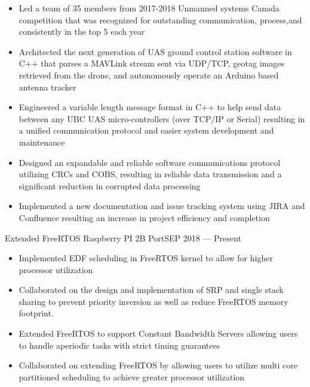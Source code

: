 
\begin{projects}
    {}{
        \begin{itemize}
            \item Led a team of 35 members from 2017-2018 Unmanned systems Canada competition that
                  was recognized for outstanding communication, process,and consistently in the top
                  5 each year
            \item Architected the next generation of UAS ground control station software in C++ that
                  parses a MAVLink stream sent via UDP/TCP, geotag images retrieved from the drone,
                  and autonomously operate an Arduino based antenna tracker
            \item Engineered a variable length message format in C++ to help send data between any
                  UBC UAS micro-controllers (over TCP/IP or Serial) resulting in a unified 
                  communication protocol and easier system development and maintenance
            \item Designed an expandable and reliable software communications protocol utilizing 
                  CRCs and COBS, resulting in reliable data transmission and a significant reduction
                  in corrupted data processing
            \item Implemented a new documentation and issue tracking system using JIRA and
                  Confluence resulting an increase in project efficiency and completion
        \end{itemize}
    }

    \project
    {Extended FreeRTOS Raspberry PI 2B Port}{SEP 2018 --- Present}{}{
        \begin{itemize}
        \item Implemented EDF scheduling in FreeRTOS kernel to allow for higher processor
              utilization
        \item Collaborated on the design and implementation of SRP and single stack sharing to
              prevent priority inversion as well as reduce FreeRTOS memory footprint.
        \item Extended FreeRTOS to support Constant Bandwidth Servers allowing users to handle
              aperiodic tasks with strict timing guarantees
        \item Collaborated on extending FreeRTOS by allowing users to utilize multi core partitioned
              scheduling to achieve greater processor utilization
        \end{itemize}
    }


\end{projects}
